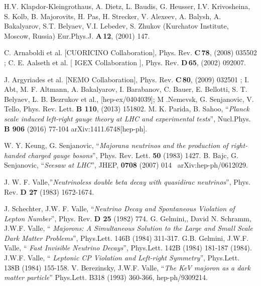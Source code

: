 \documentclass[a4paper,11pt]{article}
\begin{document}
\begin{thebibliography}{99}
 H.V. Klapdor-Kleingrothaus, A. Dietz, L. Baudis, G. Heusser, I.V. Krivosheina, S. Kolb, B. Majorovits, H. Pas, H. Strecker, V. Alexeev, A. Balysh, A. Bakalyarov, S.T. Belyaev, V.I. Lebedev, S. Zhukov (Kurchatov Institute, Moscow, Russia)
Eur.Phys.J. {\bf A\,12}, (2001)  147.

 C. Arnaboldi et al. [CUORICINO Collaboration], Phys. Rev. {\bf C\,78}, (2008)  035502 ;
         C. E. Aalseth et al. [ IGEX Collaboration ], Phys. Rev. {\bf D\,65},  (2002) 092007.    

 J. Argyriades et al. [NEMO Collaboration], Phys. Rev. {\bf C\,80}, (2009) 032501 ;
         I. Abt, M. F. Altmann, A. Bakalyarov, I. Barabanov, C. Bauer, E. Bellotti, S. T. Belyaev, 
         L. B. Bezrukov et al., [hep-ex/0404039];
M .Nemevsk, G. Senjanovic, V. Tello, Phys. Rev. Lett. {\bf B 110},  (2013) 151802.
 M. K. Parida, B. Sahoo, ``{\em Planck scale
  induced left-right gauge theory at LHC and experimental tests}'',
  Nucl.Phys. {\bf B 906} (2016) 77-104 arXiv:1411.6748[hep-ph]. 


 W. Y. Keung, G. Senjanovic, ``{\em Majorana
  neutrinos and the production of right-handed charged gauge
  bosons}'', Phys. Rev. Lett. {\bf 50} (1983) 1427.  
 B. Bajc, G. Senjanovic, ``{\em Seesaw at LHC}'', JHEP, 
{\bf 0708} (2007) 014 ~arXiv:hep-ph/0612029. 

J. W. F. Valle,''{\em Neutrinoless double beta
  decay with quasidirac neutrinos}'', Phys. Rev. {\bf D 27} (1983)
  1672-1674.

J. Schechter, J.W. F.  Valle, ``{\em Neutrino Decay and Spontaneous
  Violation of  Lepton Number}'', Phys. Rev. {\bf D 25} (1982) 774.
 G. Gelmini,, David N. Schramm,
J.W.F. Valle, `` {\em Majorons: A Simultaneous Solution to the Large and Small Scale Dark Matter Problems}'',
Phys.Lett. 146B (1984) 311-317.
 G.B. Gelmini, J.W.F. Valle, ``{ \em Fast Invisible Neutrino Decays}'', Phys.Lett. 142B (1984) 181-187
    (1984).
 J.W.F. Valle, ``{\em 
 Leptonic {CP} Violation and Left-right Symmetry}'', Phys.Lett. 138B (1984) 155-158.
V. Berezinsky, J.W.F. Valle, ``{\em The KeV majoron as a dark matter particle}'' Phys.Lett. B318 (1993) 360-366, hep-ph/9309214.
 

\end{thebibliography}
\end{document}
